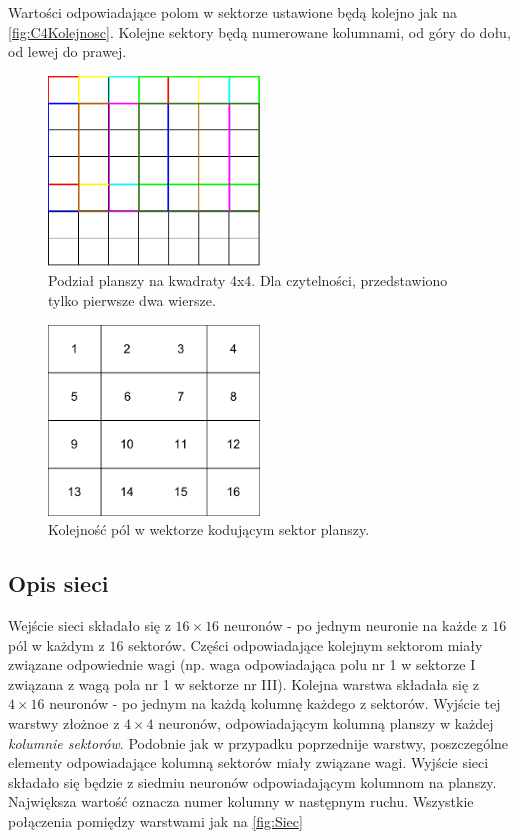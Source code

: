 \documentclass{llncs}
\begin{document}
Wartości odpowiadające polom w sektorze ustawione będą kolejno jak na \autoref{fig:C4Kolejnosc}. Kolejne sektory będą numerowane kolumnami, od góry do dołu, od lewej do prawej.

\begin{figure}[H]
	\centering	
	\includegraphics[width=0.5\textwidth]{img/ConnectFour4x4.pdf}
	\caption{Podział planszy na kwadraty 4x4. Dla czytelności, przedstawiono tylko pierwsze dwa wiersze.}
	\label{fig:C4Podzial}
\end{figure}

\begin{figure}[H]
	\centering	
	\includegraphics[width=0.5\textwidth]{img/ConnectFourOrder.pdf}	\caption{Kolejność pól w wektorze kodującym sektor planszy.}
	\label{fig:C4Kolejnosc}
\end{figure}

\subsection{Opis sieci}
Wejście sieci składało się z $16 \times 16$ neuronów - po jednym neuronie na każde z $16$ pól w każdym z $16$ sektorów. Części odpowiadające kolejnym sektorom miały związane odpowiednie wagi (np. waga odpowiadająca polu nr 1 w sektorze I związana z wagą pola nr 1 w sektorze nr III). Kolejna warstwa składała się z $4 \times 16$ neuronów - po jednym na każdą kolumnę każdego z sektorów.
Wyjście tej warstwy złożnoe z $4 \times 4$ neuronów, odpowiadającym kolumną planszy w każdej \emph{kolumnie sektorów}. Podobnie jak w przypadku 
poprzednije warstwy, poszczególne elementy odpowiadające kolumną sektorów miały związane wagi.
Wyjście sieci składało się będzie z siedmiu neuronów odpowiadającym kolumnom na planszy. Największa wartość oznacza numer kolumny w następnym ruchu.
Wszystkie połączenia pomiędzy warstwami jak na \autoref{fig:Siec}
\end{document}
